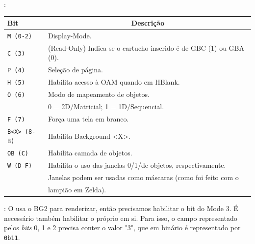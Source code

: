 \documentclass{beamer}
\let\emph\relax %
\begin{document}
\begin{darkframes}
\begin{frame}{\secname: \subsecname}
        \scriptsize{\begin{center}
            \begin{tabular}{|l|l|}
                \hline
                Bit & \multicolumn{1}{|c|}{Descrição} \\\hline
                \rowcolor[rgb]{.9,.6,.6}\texttt{M (0-2)} & Display-Mode. \\\hline
                \texttt{C (3)} & (Read-Only) Indica se o cartucho inserido é de GBC (1) ou GBA (0). \\\hline
                \texttt{P (4)} & Seleção de página. \\\hline
                \texttt{H (5)} & Habilita acesso à OAM quando em HBlank. \\\hline
                \texttt{O (6)} & Modo de mapeamento de objetos.\\
                               & 0 = 2D/Matricial; 1 = 1D/Sequencial. \\\hline
                \texttt{F (7)} & Força uma tela em branco. \\\hline
                \rowcolor{cyan}\texttt{B<X> (8-B)} & Habilita Background <X>. \\\hline
                \texttt{OB (C)} & Habilita camada de objetos. \\\hline
                \texttt{W (D-F)} & Habilita o uso das janelas 0/1/de objetos, respectivamente. \\
                                 & Janelas podem ser usadas como máscaras (como foi feito com o \\
                                 & lampião em Zelda). \\\hline
            \end{tabular}
        \end{center}}
    \end{frame}

    \begin{frame}{\secname: \subsecname}
        O \emph{Mode 3} usa o BG2 para renderizar, então precisamos habilitar o bit do Mode 3.
        É necessário também habilitar o próprio \emph{Mode 3} em si. Para isso,
        o campo representado pelos \textit{bits} 0, 1 e 2 precisa conter o valor "3",
        que em binário é representado por \texttt{0b11}.


\end{frame}
\end{darkframes}
\end{document}
